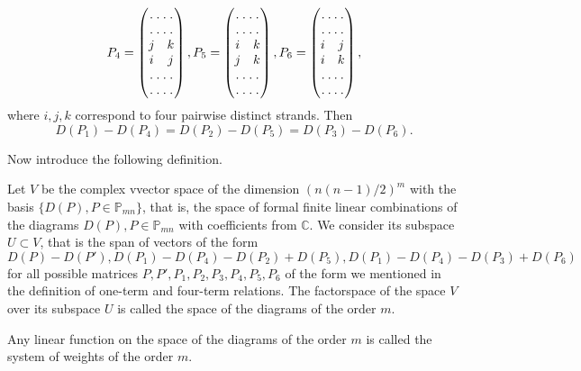 \documentclass[12pt, a4paper, titlepage]{article}
\begin{document}
\begin{itemize}
\begin{equation}\nonumber
P_4=\begin{pmatrix}\hdotsfor{2}\\ \hdotsfor{2}\\ j&k\\i&j \\ \hdotsfor{2}\\ \hdotsfor{2}\end{pmatrix},
P_5=\begin{pmatrix}\hdotsfor{2}\\ \hdotsfor{2}\\ i&k\\j&k \\ \hdotsfor{2}\\ \hdotsfor{2}\end{pmatrix},
P_6=\begin{pmatrix}\hdotsfor{2}\\ \hdotsfor{2}\\ i&j\\i&k \\ \hdotsfor{2}\\ \hdotsfor{2}\end{pmatrix},
\end{equation}
where $i,j,k$ correspond to four pairwise distinct strands.
Then
\begin{equation}\nonumber
D(P_1)-D(P_4)=D(P_2)-D(P_5)=D(P_3)-D(P_6).
\end{equation}
\end{itemize}
Now introduce the following definition. 

\begin{definition} Let $V$ be the complex vvector space of the dimension $(n(n-1)/2)^m$
with the basis $\{D(P), P\in \mathbb{P}_{mn}\}$, that is, the space of formal finite
linear combinations of the diagrams $D(P), P\in \mathbb{P}_{mn}$ with coefficients from $\mathbb{C}$. 
We consider its subspace $U\subset V$, that is the span of vectors of the form
$D(P)-D(P'),D(P_1)-D(P_4)-D(P_2)+D(P_5), D(P_1)-D(P_4)-D(P_3)+D(P_6)$ 
for all possible matrices
$P, P', P_1, P_2, P_3, P_4, P_5, P_6$ of the form we mentioned in the definition of one-term
and four-term relations.
The factorspace of the space $V$ over its subspace $U$ is called
the space of the diagrams of the order $m$. 
\end{definition}

\begin{definition} Any linear function on the space of the diagrams of the order $m$ 
is called the system of weights of the order $m$.
\end{definition}
\end{document}
